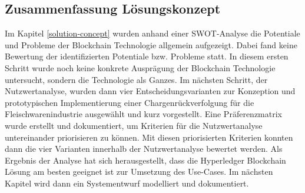 \subsection{Zusammenfassung Lösungskonzept}
Im Kapitel \ref{solution-concept} wurden anhand einer SWOT-Analyse die Potentiale und Probleme der Blockchain Technologie allgemein aufgezeigt. Dabei fand keine Bewertung der identifizierten Potentiale bzw. Probleme statt. In diesem ersten Schritt wurde noch keine konkrete Ausprägung der Blockchain Technologie untersucht, sondern die Technologie als Ganzes. Im nächsten Schritt, der Nutzwertanalyse, wurden dann vier Entscheidungsvarianten zur Konzeption und prototypischen Implementierung einer Chargenrückverfolgung für die Fleischwarenindustrie ausgewählt und kurz vorgestellt. Eine Präferenzmatrix wurde erstellt und dokumentiert, um Kriterien für die Nutzwertanalyse untereinander priorisieren zu können. Mit diesen priorisierten Kriterien konnten dann die vier Varianten innerhalb der Nutzwertanalyse bewertet werden. Als Ergebnis der Analyse hat sich herausgestellt, dass die Hyperledger Blockchain Lösung am besten geeignet ist zur Umsetzung des Use-Cases. Im nächsten Kapitel wird dann ein Systementwurf modelliert und dokumentiert.

\newpage
